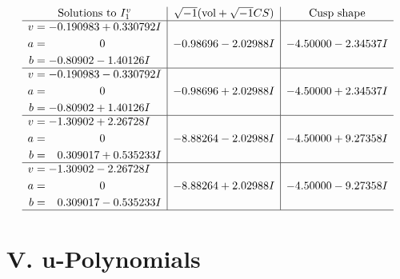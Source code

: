\documentclass[1p]{elsarticle_modified}
\theoremstyle{definition}
\newcommand{\I}{\sqrt{-1}}
\begin{document}
$$\begin{array}{c|c|c}  
\text{Solutions to }I^v_{1}& \I (\text{vol} + \sqrt{-1}CS) & \text{Cusp shape}\\
 \hline 
\begin{aligned}
v &= -0.190983 + 0.330792 I \\
a &= \phantom{-0.000000 } 0 \\
b &= -0.80902 - 1.40126 I\end{aligned}
 & -0.98696 - 2.02988 I & -4.50000 - 2.34537 I \\ \hline\begin{aligned}
v &= -0.190983 - 0.330792 I \\
a &= \phantom{-0.000000 } 0 \\
b &= -0.80902 + 1.40126 I\end{aligned}
 & -0.98696 + 2.02988 I & -4.50000 + 2.34537 I \\ \hline\begin{aligned}
v &= -1.30902 + 2.26728 I \\
a &= \phantom{-0.000000 } 0 \\
b &= \phantom{-}0.309017 + 0.535233 I\end{aligned}
 & -8.88264 - 2.02988 I & -4.50000 + 9.27358 I \\ \hline\begin{aligned}
v &= -1.30902 - 2.26728 I \\
a &= \phantom{-0.000000 } 0 \\
b &= \phantom{-}0.309017 - 0.535233 I\end{aligned}
 & -8.88264 + 2.02988 I & -4.50000 - 9.27358 I\\
 \hline 
 \end{array}$$\newpage
\newpage\renewcommand{\arraystretch}{1}
\centering \section*{ V. u-Polynomials}
\end{document}
